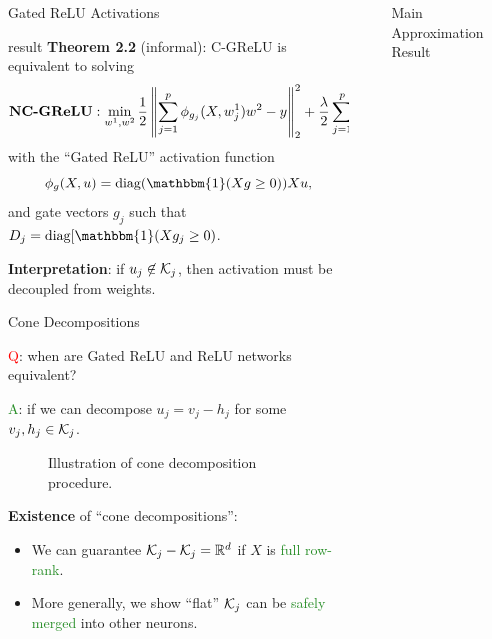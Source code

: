 \documentclass[12pt, usenames, dvipsnames]{beamer}
\newlength{\sepwidth}
\newlength{\colwidth}
\newcommand{\separatorcolumn}{\begin{column}{\sepwidth}\end{column}}
\newcommand{\red}[1]{\textcolor{Red}{#1}}
\newcommand{\green}[1]{\textcolor{ForestGreen}{#1}}
\begin{document}
\begin{frame}[t]
\begin{columns}[t]
\begin{column}{\colwidth}
\begin{block}{Gated ReLU Activations}
				\begin{beamercolorbox}[wd=\textwidth,sep=1em]{result}
					\textbf{Theorem 2.2} (informal): C-GReLU is equivalent to solving
					\[
						\textbf{NC-GReLU}: \min_{w^1, w^2} \frac 1 2 \left\|\sum_{j=1}^p \phi_{g_j}(X, w^1_{j})w^2 - y\right\|_2^2 + \frac{\lambda}{2} \sum_{j=1}^p \left\|w^1_{j}\right\|_2^2 + \left\|w_j^2\right\|_2^2,
					\]
					with the ``Gated ReLU'' \citep{fiat2019decoupling} activation function
					\[ \phi_{g}(X, u) = \text{diag}(\mathbbm{1}(Xg \geq 0)) X u, \]
					and gate vectors \( g_j \) such that \( D_j = \text{diag}[\mathbbm{1}(X g_j \geq 0) \).
				\end{beamercolorbox}

				\textbf{Interpretation}: if \( u_j \not \in \mathcal{K}_j \), then activation
				must be decoupled from weights.

			\end{block}
			\vspace{-1em}
			\begin{block}{Cone Decompositions}
				\large
				{ \Large
					\red{Q}: when are Gated ReLU and ReLU networks equivalent?

					\green{A}: if we can decompose \( u_j = v_j - h_j \) for some \( v_j, h_j \in \mathcal{K}_j \).
				}

				\begin{figure}[t]
					
					\caption{Illustration of cone decomposition procedure.}
					\label{fig:cone-decomp}
				\end{figure}

				\textbf{Existence} of ``cone decompositions'':
				\vspace{-0.5em}
				\begin{itemize}
					\item We can guarantee \( \mathcal{K}_j - \mathcal{K}_j = \mathbb{R}^d \) if \( X \) is \green{full row-rank}.
					\item More generally, we show ``flat'' \( \mathcal{K}_j \) can be \green{safely merged} into other neurons.
				\end{itemize}
			\end{block}
		\end{column}

		\separatorcolumn

		\begin{column}{\colwidth}
			\vspace{-1.5em}
			\begin{block}{Main Approximation Result}

				\large
				\vspace{1em}


\end{block}
\end{column}
\end{columns}
\end{frame}
\end{document}
